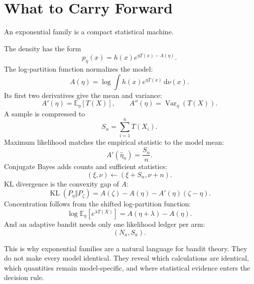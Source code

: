 \documentclass[en,nofont,11pt]{elegantbook}
\newcommand{\E}{\mathbb{E}}
\newcommand{\KL}{\operatorname{KL}}
\newcommand{\Var}{\operatorname{Var}}
\newcommand{\dd}{\mathrm{d}}
\begin{document}
\chapter{What to Carry Forward}

An exponential family is a compact statistical machine.

The density has the form
\[
p_\eta(x)=h(x)e^{\eta T(x)-A(\eta)}.
\]
The log-partition function normalizes the model:
\[
A(\eta)=\log\int h(x)e^{\eta T(x)}\,\dd\nu(x).
\]
Its first two derivatives give the mean and variance:
\[
A'(\eta)=\E_\eta[T(X)],
\qquad
A''(\eta)=\Var_\eta(T(X)).
\]
A sample is compressed to
\[
S_n=\sum_{i=1}^{n}T(X_i).
\]
Maximum likelihood matches the empirical statistic to the model mean:
\[
A'(\widehat\eta_n)=\frac{S_n}{n}.
\]
Conjugate Bayes adds counts and sufficient statistics:
\[
(\xi,\nu)\leftarrow(\xi+S_n,\nu+n).
\]
KL divergence is the convexity gap of $A$:
\[
\KL(P_\eta\Vert P_\zeta)
=A(\zeta)-A(\eta)-A'(\eta)(\zeta-\eta).
\]
Concentration follows from the shifted log-partition function:
\[
\log\E_\eta[e^{\lambda T(X)}]
=A(\eta+\lambda)-A(\eta).
\]
And an adaptive bandit needs only one likelihood ledger per arm:
\[
(N_a,S_a).
\]

\begin{center}
\end{center}

This is why exponential families are a natural language for bandit theory. They do not make every model identical. They reveal which calculations are identical, which quantities remain model-specific, and where statistical evidence enters the decision rule.
\end{document}
